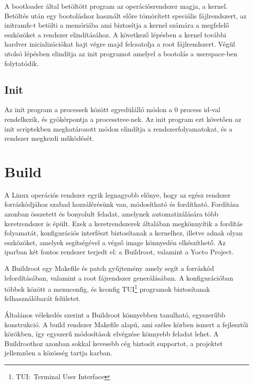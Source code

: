 A bootloader által betöltött program az operációsrendszer magja, a
kernel. Betöltés után egy bootoláshoz használt előre tömörített speciális
fájlrendszert, az initramfs-t betölti a memóriába ami biztosítja a kernel számára
a megfelelő eszközöket a rendszer elindításához. A következő lépésben a kernel
további hardver inicializációkat hajt végre majd felcsatolja a root
fájlrendszert. Végül utolsó lépésben elindítja az init programot amelyel a
bootolás a userspace-ben folytatódik.

\subsection{Init}

Az init program a processek között egyedülálló módon a 0 process id-val
rendelkezik, és gyökérpontja a processtree-nek. Az init program ezt követően az
init scriptekben meghatározott módon elindítja a rendszerfolyamatokat, és a
rendszer megkezdi működését.

\section{Build}

A Linux operációs rendszer egyik legnagyobb előnye, hogy az egész rendszer
forráskódjához szabad hozzáférésünk van, módosítható és fordítható. Fordítása
azonban összetett és bonyolult feladat, amelynek automatizálására több
keretrendszer is épült. Ezek a keretrendszerek általában megkönnyítik a fordítás
folyamatát, konfigurációs interfészt biztosítanak a kernelhez, illetve adnak
olyan eszközöket, amelyek segítségével a végső image könnyedén elkészíthető. Az
iparban két fontos rendszer terjedt el: a Buildroot, valamint a Yocto Project.

\medskip

A Buildroot egy Makefile és patch gyűjtemény amely segít a forráskód
lefordításában, valamint a root fájrendszer generálásában. A konfigurációban
többek között a menuconfig, és kconfig TUI\footnote{TUI:~Terminal User Interface}
programok biztosítanak felhasználóbarát felületet. 

Általános vélekedés szerint a Buildroot könnyebben tanulható, egyszerűbb
konstrukció. A build rendszer Makefile alapú, ami széles körben ismert a
fejlesztői körökben, így egyszerű módosítások elvégzése könnyebb feladat lehet. A
Buildroothoz azonban sokkal kevesebb cég biztosít supportot, a projektet
jellemzően a közösség tartja karban.

\medskip

